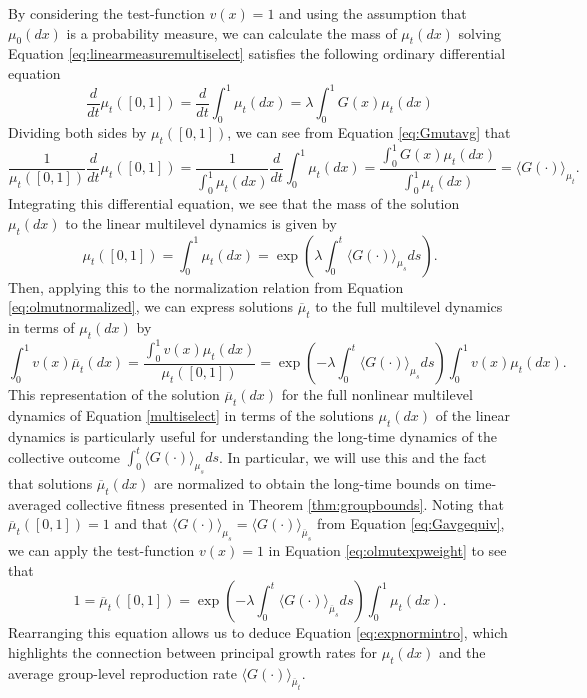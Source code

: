 \documentclass[11pt]{article}
\numberwithin{equation}{section}
\newcommand{\ol}{\overline}
\newcommand{\dsddt}[1]{\displaystyle\frac{d #1}{dt}}
\begin{document}
{By considering the test-function $v(x) = 1$ and using the assumption that $\mu_0(dx)$ is a probability measure, we can calculate the mass of $\mu_t(dx)$ solving Equation \eqref{eq:linearmeasuremultiselect} satisfies the following ordinary differential equation 
\begin{equation}
   \dsddt{} \mu_t\left([0,1]\right) =  \dsddt{} \int_0^1 \mu_t(dx) = \lambda \int_0^1 G(x) \mu_t(dx) %
\end{equation}
Dividing both sides by $\mu_t([0,1])$, we can see from Equation \eqref{eq:Gmutavg} that
\begin{equation}
    \frac{1}{\mu_t([0,1])} \dsddt{} \mu_t([0,1]) = \frac{1}{\int_0^1 \mu_t(dx)} \dsddt{} \int_0^1 \mu_t(dx) = \frac{\int_0^1 G(x) \mu_t(dx)}{\int_0^1 \mu_t(dx)} = \langle G(\cdot) \rangle_{\mu_t}.
\end{equation}
Integrating this differential equation, we see that the mass of the solution $\mu_t(dx)$ to the linear multilevel dynamics is given by
\begin{equation} \label{eq:solutionmass} 
    \mu_t\left([0,1]\right) = \int_0^1 \mu_t(dx) = \exp\left( \lambda \int_0^t \langle G(\cdot) \rangle_{\mu_s} ds \right).
\end{equation}
Then, applying this to the normalization relation from Equation \eqref{eq:olmutnormalized}, we can express solutions $\ol{\mu}_t$ to the full multilevel dynamics in terms of $\mu_t(dx)$ by
\begin{equation} \label{eq:olmutexpweight}
   \int_0^1 v(x) \ol{\mu}_t(dx) = \frac{\int_0^1 v(x) \mu_t(dx)}{\mu_t\left([0,1]\right)} = \exp\left(-\lambda \int_0^t \langle G(\cdot) \rangle_{\mu_s} ds \right) \int_0^1 v(x)  \mu_t(dx).
\end{equation}
This representation of the solution $\ol{\mu}_t(dx)$ for the full nonlinear multilevel dynamics of Equation \eqref{multiselect} in terms of the solutions $\mu_t(dx)$ of the linear dynamics is particularly useful for understanding the long-time dynamics of the collective outcome $\int_0^t \langle G(\cdot) \rangle_{\mu_s} ds$. In particular, we will use this and the fact that solutions $\ol{\mu}_t(dx)$ are normalized to obtain the long-time bounds on time-averaged collective fitness presented in Theorem \ref{thm:groupbounds}. Noting that $\ol{\mu}_t([0,1]) = 1$ and that $\langle G(\cdot) \rangle_{\mu_s} = \langle G(\cdot) \rangle_{\ol{\mu}_s}$ from Equation \eqref{eq:Gavgequiv}, we can apply the test-function $v(x) = 1$ in Equation \eqref{eq:olmutexpweight} to see that
\begin{equation} \label{eq:expnormsecond}
    1 = \ol{\mu}_t([0,1]) = \exp\left(-\lambda \int_0^t \langle G(\cdot) \rangle_{\ol{\mu}_s} ds \right) \int_0^1 \mu_t(dx).
\end{equation}
Rearranging this equation allows us to deduce Equation \eqref{eq:expnormintro}, which highlights the connection between principal growth rates for $\mu_t(dx)$ and the average group-level reproduction rate $\langle G(\cdot) \rangle_{\ol{\mu}_t}.$

}
\end{document}
